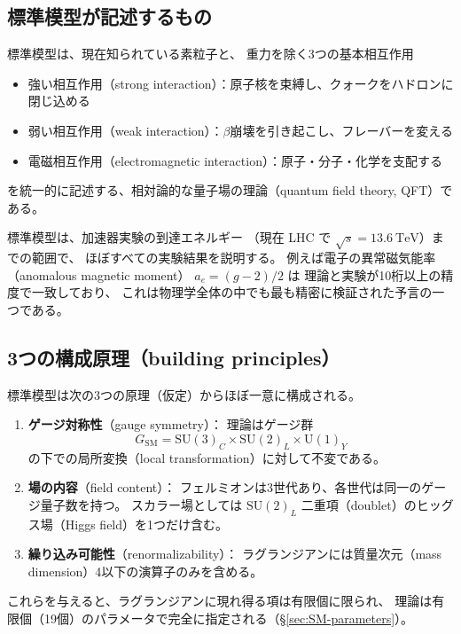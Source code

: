 \documentclass[uplatex,dvipdfmx,a4paper,11pt,openany]{jsbook}
\newcommand{\term}[2]{\textbf{#1}（#2）}
\newcommand{\en}[1]{（#1）}
\numberwithin{equation}{chapter}
\theoremstyle{definition}
\theoremstyle{plain}
\theoremstyle{remark}
\newcommand{\SM}{\mathrm{SM}}
\newcommand{\SU}{\mathrm{SU}}
\newcommand{\U}{\mathrm{U}}
\begin{document}
\subsection{標準模型が記述するもの}
標準模型は、現在知られている素粒子と、
重力を除く3つの基本相互作用
\begin{itemize}
    \item 強い相互作用\en{strong interaction}：原子核を束縛し、クォークをハドロンに閉じ込める
    \item 弱い相互作用\en{weak interaction}：$\beta$崩壊を引き起こし、フレーバーを変える
    \item 電磁相互作用\en{electromagnetic interaction}：原子・分子・化学を支配する
\end{itemize}
を統一的に記述する、相対論的な量子場の理論\en{quantum field theory, QFT}である。

標準模型は、加速器実験の到達エネルギー
（現在 LHC で $\sqrt s=13.6\ \mathrm{TeV}$）までの範囲で、
ほぼすべての実験結果を説明する。
例えば電子の異常磁気能率\en{anomalous magnetic moment} $a_e=(g-2)/2$ は
理論と実験が10桁以上の精度で一致しており、
これは物理学全体の中でも最も精密に検証された予言の一つである。
\subsection{3つの構成原理（building principles）}
標準模型は次の3つの原理（仮定）からほぼ一意に構成される。
\begin{enumerate}
    \item \term{ゲージ対称性}{gauge symmetry}：
    理論はゲージ群
    \begin{equation}
    G_{\SM}=\SU(3)_C\times\SU(2)_L\times\U(1)_Y
    \end{equation}
    の下での局所変換\en{local transformation}に対して不変である。
    \item \term{場の内容}{field content}：
    フェルミオンは3世代あり、各世代は同一のゲージ量子数を持つ。
    スカラー場としては $\SU(2)_L$ 二重項\en{doublet}のヒッグス場\en{Higgs field}を1つだけ含む。
    \item \term{繰り込み可能性}{renormalizability}：
    ラグランジアンには質量次元\en{mass dimension}4以下の演算子のみを含める。
\end{enumerate}
これらを与えると、ラグランジアンに現れ得る項は有限個に限られ、
理論は有限個（19個）のパラメータで完全に指定される（\S\ref{sec:SM-parameters}）。
\end{document}
